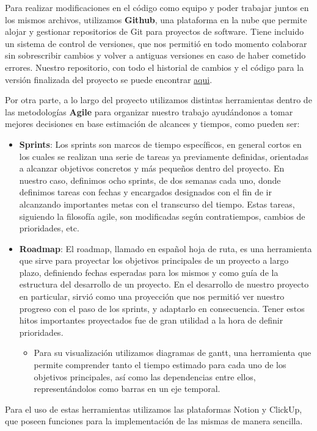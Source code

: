 Para realizar modificaciones en el código como equipo y poder trabajar juntos en los mismos archivos, utilizamos \textbf{Github}, una plataforma en la nube que permite alojar y gestionar repositorios de Git para proyectos de software. Tiene incluido un sistema de control de versiones, que nos permitió en todo momento colaborar sin sobrescribir cambios y volver a antiguas versiones en caso de haber cometido errores. Nuestro repositorio, con todo el historial de cambios y el código para la versión finalizada del proyecto se puede encontrar \textcolor{blue}{\href{https://github.com/fedeegiorgi/proyecto-final}{aqui}}.

Por otra parte, a lo largo del proyecto utilizamos distintas herramientas dentro de las metodologías \textbf{Agile} para organizar nuestro trabajo ayudándonos a tomar mejores decisiones en base estimación de alcances y tiempos, como pueden ser:

\begin{itemize}
    \item \textbf{Sprints}: Los sprints son marcos de tiempo específicos, en general cortos en los cuales se realizan una serie de tareas ya previamente definidas, orientadas a alcanzar objetivos concretos y más pequeños dentro del proyecto. En nuestro caso, definimos ocho sprints, de dos semanas cada uno, donde definimos tareas con fechas y encargados designados con el fin de ir alcanzando importantes metas con el transcurso del tiempo. Estas tareas, siguiendo la filosofía agile, son modificadas según contratiempos, cambios de prioridades, etc.
    
    \item \textbf{Roadmap}: El roadmap, llamado en español hoja de ruta, es una herramienta que sirve para proyectar los objetivos principales de un proyecto a largo plazo, definiendo fechas esperadas para los mismos y como guía de la estructura del desarrollo de un proyecto. En el desarrollo de nuestro proyecto en particular, sirvió como una proyección que nos permitió ver nuestro progreso con el paso de los sprints, y adaptarlo en consecuencia. Tener estos hitos importantes proyectados fue de gran utilidad a la hora de definir prioridades. 
    \begin{itemize}
        \item Para su visualización utilizamos diagramas de gantt, una herramienta que permite comprender tanto el tiempo estimado para cada uno de los objetivos principales, así como las dependencias entre ellos, representándolos como barras en un eje temporal.
    \end{itemize}

\end{itemize}

Para el uso de estas herramientas utilizamos las plataformas Notion y ClickUp, que poseen funciones para la implementación de las mismas de manera sencilla.